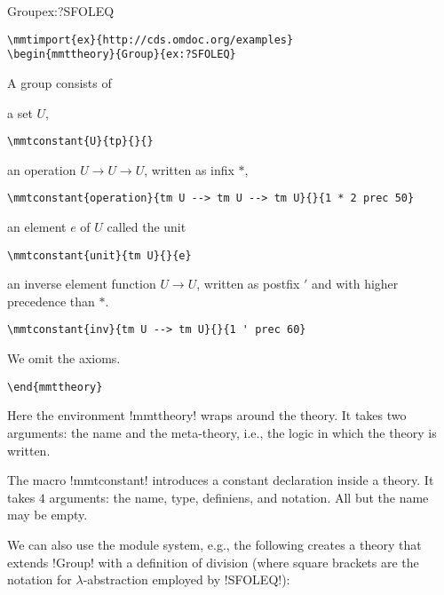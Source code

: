 \begin{mmttheory}{Group}{ex:?SFOLEQ}
\begin{lstlisting}
\mmtimport{ex}{http://cds.omdoc.org/examples}
\begin{mmttheory}{Group}{ex:?SFOLEQ}
\end{lstlisting}

A group consists of
\begin{compactitem}
 \item a set $U$,
\begin{lstlisting}
\mmtconstant{U}{tp}{}{}
\end{lstlisting}

 \item an operation $U\to U \to U$, written as infix $*$,
\begin{lstlisting}
\mmtconstant{operation}{tm U --> tm U --> tm U}{}{1 * 2 prec 50}
\end{lstlisting}

 \item an element $e$ of $U$ called the unit
\begin{lstlisting}
\mmtconstant{unit}{tm U}{}{e}
\end{lstlisting}

\item an inverse element function $U\to U$, written as postfix $'$ and with higher precedence than $*$.
\begin{lstlisting}
\mmtconstant{inv}{tm U --> tm U}{}{1 ' prec 60}
\end{lstlisting}
\end{compactitem}
We omit the axioms.

\end{mmttheory}
\begin{lstlisting}
\end{mmttheory}
\end{lstlisting}

Here the environment !mmttheory! wraps around the theory.
It takes two arguments: the name and the meta-theory, i.e., the logic in which the theory is written.

The macro !mmtconstant! introduces a constant declaration inside a theory.
It takes $4$ arguments: the name, type, definiens, and notation. All but the name may be empty.

We can also use the \mmt module system, e.g., the following creates a theory that extends !Group! with a definition of division (where square brackets are the notation for $\lambda$-abstraction employed by !SFOLEQ!):

